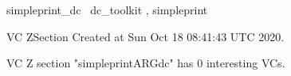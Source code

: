 \documentclass{article}
\begin{document}

\begin{zsection}	 \SECTION simpleprint\_dc \parents~dc\_toolkit , simpleprint
\end{zsection}

\newcommand{\appliesTo}{\zbinop{appliesTo}} 
\newcommand{\appliesToNofix}{\zpreop{appliesToNofix}} 

VC ZSection Created at Sun Oct 18 08:41:43 UTC 2020.



 VC Z section "simpleprintARGdc" has $0$ interesting VCs.



\end{document}
